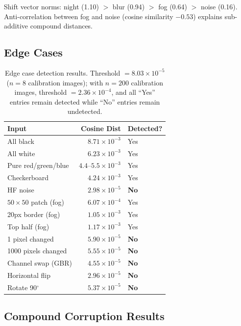 \documentclass[11pt]{article}
\begin{document}
Shift vector norms: night (1.10) $>$ blur (0.94) $>$ fog (0.64) $>$ noise (0.16).
Anti-correlation between fog and noise (cosine similarity $-0.53$) explains sub-additive compound distances.

\subsection{Edge Cases}
\label{app:edge_cases}

\begin{table}[h]
\centering
\caption{Edge case detection results. Threshold $= 8.03 \times 10^{-5}$ ($n{=}8$ calibration images); with $n{=}200$ calibration images, threshold $= 2.36 \times 10^{-4}$, and all ``Yes'' entries remain detected while ``No'' entries remain undetected.}
\label{tab:edge_cases}
\small
\begin{tabular}{lrl}
\toprule
\textbf{Input} & \textbf{Cosine Dist} & \textbf{Detected?} \\
\midrule
All black & $8.71 \times 10^{-3}$ & Yes \\
All white & $6.23 \times 10^{-3}$ & Yes \\
Pure red/green/blue & $4.4\text{--}5.5 \times 10^{-3}$ & Yes \\
Checkerboard & $4.24 \times 10^{-3}$ & Yes \\
HF noise & $2.98 \times 10^{-5}$ & \textbf{No} \\
\midrule
$50\times50$ patch (fog) & $6.07 \times 10^{-4}$ & Yes \\
20px border (fog) & $1.05 \times 10^{-3}$ & Yes \\
Top half (fog) & $1.17 \times 10^{-3}$ & Yes \\
\midrule
1 pixel changed & $5.90 \times 10^{-5}$ & \textbf{No} \\
1000 pixels changed & $5.55 \times 10^{-5}$ & \textbf{No} \\
Channel swap (GBR) & $4.55 \times 10^{-5}$ & \textbf{No} \\
Horizontal flip & $2.96 \times 10^{-5}$ & \textbf{No} \\
Rotate 90$^\circ$ & $5.37 \times 10^{-5}$ & \textbf{No} \\
\bottomrule
\end{tabular}
\end{table}

\subsection{Compound Corruption Results}
\label{app:compound}
\end{document}
